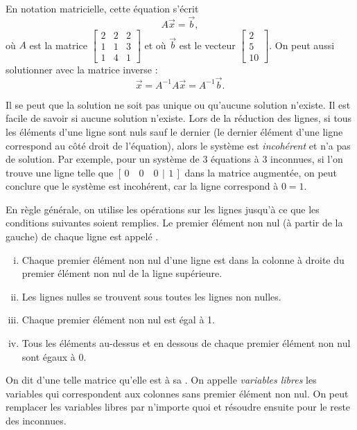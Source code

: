 En notation matricielle, cette équation s'écrit
\begin{equation*}
A \vec{x} = \vec{b} ,
\end{equation*}
où $A$ est la matrice
$\left[ \begin{smallmatrix}
2 & 2 & 2 \\
1 & 1 & 3 \\
1 & 4 & 1 
\end{smallmatrix} \right]$ et où $\vec{b}$ est le vecteur
$\left[ \begin{smallmatrix}
2 \\
5 \\
10
\end{smallmatrix} \right]$. On peut aussi solutionner avec la matrice inverse :
\begin{equation*}
\vec{x} = A^{-1} A \vec{x} = A^{-1} \vec{b} .
\end{equation*}

\medskip

Il se peut que la solution ne soit pas unique ou qu'aucune solution n'existe. Il est facile de savoir si aucune solution n'existe. Lors de la réduction des lignes, si tous les éléments d'une ligne sont nuls sauf le dernier (le dernier élément d'une ligne correspond au côté droit de l'équation), alors le système est \emph{incohérent} et n'a pas de solution. Par exemple, pour un système de 3 équations à 3 inconnues, si l'on trouve une ligne telle que $[\,0 \quad 0 \quad 0 ~\,|\,~ 1\,]$ dans la matrice augmentée, on peut conclure que le système est incohérent, car la ligne correspond à $0=1$.

\medskip

En règle générale, on utilise les opérations sur les lignes jusqu'à ce que les conditions suivantes soient remplies. Le premier élément non nul (à partir de la gauche) de chaque ligne est appelé
\emph{}.
\begin{enumerate}[(i)]
\item Chaque premier élément non nul d'une ligne est dans la colonne à droite du premier élément non nul de la ligne supérieure.
\item Les lignes nulles se trouvent sous toutes les lignes non nulles.
\item Chaque premier élément non nul est égal à 1.
\item Tous les éléments au-dessus et en dessous de chaque premier élément non nul sont égaux à 0.
\end{enumerate}
On dit d'une telle matrice qu'elle est à sa
\emph{}. On appelle \emph{variables libres} les variables qui correspondent aux colonnes sans premier élément non nul. On peut remplacer les variables libres par n'importe quoi et résoudre ensuite pour le reste des inconnues.

